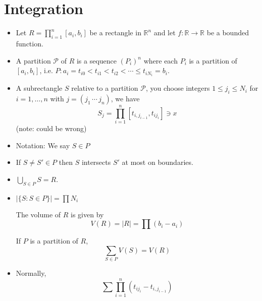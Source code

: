 \section{Integration}
\begin{itemize}
    \item Let $R=\prod_{i=1}^n [a_i,b_i]$ be a rectangle in $\mathbb{R}^n$ and let $f:\mathbb{R}\rightarrow \mathbb{R}$ be a bounded function.
    \item A partition $\mathcal{P}$ of $R$ is a sequence $(P_i)^n$ where each $P_i$ is a partition of $[a_i,b_i]$, i.e. $P:a_i = t_{i0} < t_{i1} < t_{i2} < \cdots \le t_{iN_i}=b_i.$
    \item A subrectangle $S$ relative to a partition $\mathcal{P}$, you choose integers $1 \le j_i \le N_i$ for $i=1,\dots, n$ with $j=(j_1\, \cdots\, j_n)$, we have 
    \begin{equation}
        S_j = \prod_{i=1}^n [t_{i,j_{i-1}}, t_{ij_i}] \ni x
    \end{equation}
    (note: could be wrong)
    \item Notation: We say $S \in P$
    \item If $S \neq S' \in P$ then $S$ intersects $S'$ at most on boundaries.
    \item $\bigcup_{S\in P}S = R$.
    \item $\left|\{S:S\in P\}\right|=\prod N_i$
    \begin{definition}
        The volume of $R$ is given by
        \begin{equation}
            V(R) = |R| = \prod (b_i-a_i)
        \end{equation}
    \end{definition}
    \begin{proposition}
        If $P$ is a partition of $R$,
        \begin{equation}
            \sum_{S\in P}V(S) = V(R)
        \end{equation}
    \end{proposition}
    \item Normally,
    \begin{equation}
        \sum \prod_{i=1}^n (t_{ij_i}-t_{i,j_{i-1}})
    \end{equation}
\end{itemize}